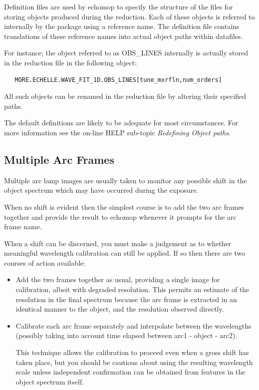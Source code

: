 \documentclass[11pt,twoside]{article}
\newcommand{\xlabel}[1]{}
\newcommand{\mlabel}[1]{\xlabel{#1}\label{#1}}
\newcommand{\myindex}[1]{\index{#1}}
\renewcommand{\myindex}[1]{}
\begin{document}
Definition files are used by {\sc echomop} to specify the structure of the
files for storing objects produced during the reduction.
Each of these objects is referred to internally by the package using a
reference name.  The definition file contains translations of these
reference names into actual object paths within datafiles.

For instance; the object referred to as OBS\_LINES internally is
actually stored in the reduction file in the following object:

\begin{verbatim}
   MORE.ECHELLE.WAVE_FIT_1D.OBS_LINES[tune_mxrfln,num_orders]
\end{verbatim}

All such objects can be renamed in the reduction file by altering their
specified paths.

The default definitions are likely to be adequate for most
circumstances.  For more information see the on-line HELP sub-topic
{\sl Redefining Object paths}.

\subsection{\mlabel{multi_arc_frames}Multiple Arc Frames}
\myindex{Arc frames!multiple}

Multiple arc lamp images are usually taken to monitor any possible shift
in the object spectrum which may have occurred during the exposure.

When no shift is evident then the simplest course is to add the two arc
frames together and provide the result to {\sc echomop} whenever it
prompts for the arc frame name.

When a shift can be discerned, you must make a judgement as to
whether meaningful wavelength calibration can still be applied. If so
then there are two courses of action available:

\begin{itemize}

\item Add the two frames together as usual, providing a single image for
calibration, albeit with degraded resolution. This permits an  estimate
of the resolution in the final spectrum because the arc frame is
extracted in an identical manner to the object,  and the resolution
observed directly.

\item Calibrate each arc frame separately and interpolate between the
wavelengths (possibly taking into account time elapsed between arc1 -
object - arc2).

This technique allows the calibration to proceed even when a gross shift
has taken place, but you should be cautious about using the resulting
wavelength scale unless independent confirmation can be obtained from
features in the object spectrum itself.

\end{itemize}
\end{document}
